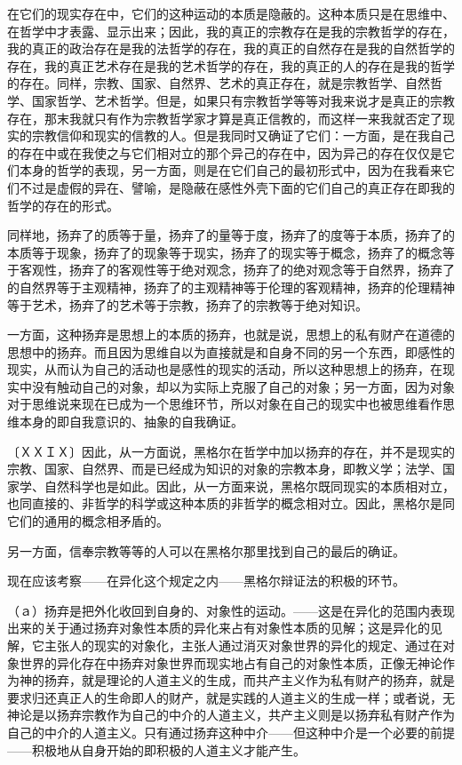 \documentclass[a4paper,twoside,12pt]{ctexart}
\begin{document}
在它们的现实存在中，它们的这种运动的本质是隐蔽的。这种本质只是在思维中、在哲学中才表露、显示出来；因此，我的真正的宗教存在是我的宗教哲学的存在，我的真正的政治存在是我的法哲学的存在，我的真正的自然存在是我的自然哲学的存在，我的真正艺术存在是我的艺术哲学的存在，我的真正的人的存在是我的哲学的存在。同样，宗教、国家、自然界、艺术的真正存在，就是宗教哲学、自然哲学、国家哲学、艺术哲学。但是，如果只有宗教哲学等等对我来说才是真正的宗教存在，那末我就只有作为宗教哲学家才算是真正信教的，而这样一来我就否定了现实的宗教信仰和现实的信教的人。但是我同时又确证了它们：一方面，是在我自己的存在中或在我使之与它们相对立的那个异己的存在中，因为异己的存在仅仅是它们本身的哲学的表现，另一方面，则是在它们自己的最初形式中，因为在我看来它们不过是虚假的异在、譬喻，是隐蔽在感性外壳下面的它们自己的真正存在即我的哲学的存在的形式。

同样地，扬弃了的质等于量，扬弃了的量等于度，扬弃了的度等于本质，扬弃了的本质等于现象，扬弃了的现象等于现实，扬弃了的现实等于概念，扬弃了的概念等于客观性，扬弃了的客观性等于绝对观念，扬弃了的绝对观念等于自然界，扬弃了的自然界等于主观精神，扬弃了的主观精神等于伦理的客观精神，扬弃的伦理精神等于艺术，扬弃了的艺术等于宗教，扬弃了的宗教等于绝对知识。

一方面，这种扬弃是思想上的本质的扬弃，也就是说，思想上的私有财产在道德的思想中的扬弃。而且因为思维自以为直接就是和自身不同的另一个东西，即感性的现实，从而认为自己的活动也是感性的现实的活动，所以这种思想上的扬弃，在现实中没有触动自己的对象，却以为实际上克服了自己的对象；另一方面，因为对象对于思维说来现在已成为一个思维环节，所以对象在自己的现实中也被思维看作思维本身的即自我意识的、抽象的自我确证。

〔ＸＸＩＸ〕因此，从一方面说，黑格尔在哲学中加以扬弃的存在，并不是现实的宗教、国家、自然界、而是已经成为知识的对象的宗教本身，即教义学；法学、国家学、自然科学也是如此。因此，从一方面来说，黑格尔既同现实的本质相对立，也同直接的、非哲学的科学或这种本质的非哲学的概念相对立。因此，黑格尔是同它们的通用的概念相矛盾的。

另一方面，信奉宗教等等的人可以在黑格尔那里找到自己的最后的确证。

现在应该考察——在异化这个规定之内——黑格尔辩证法的积极的环节。

（ａ）扬弃是把外化收回到自身的、对象性的运动。——这是在异化的范围内表现出来的关于通过扬弃对象性本质的异化来占有对象性本质的见解；这是异化的见解，它主张人的现实的对象化，主张人通过消灭对象世界的异化的规定、通过在对象世界的异化存在中扬弃对象世界而现实地占有自己的对象性本质，正像无神论作为神的扬弃，就是理论的人道主义的生成，而共产主义作为私有财产的扬弃，就是要求归还真正人的生命即人的财产，就是实践的人道主义的生成一样；或者说，无神论是以扬弃宗教作为自己的中介的人道主义，共产主义则是以扬弃私有财产作为自己的中介的人道主义。只有通过扬弃这种中介——但这种中介是一个必要的前提——积极地从自身开始的即积极的人道主义才能产生。
\end{document}
